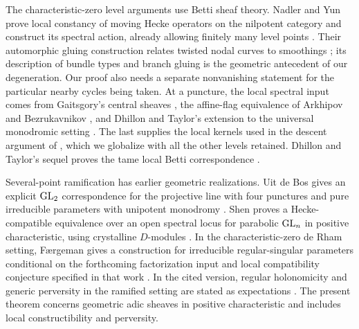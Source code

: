 The characteristic-zero level arguments use Betti sheaf theory.
Nadler and Yun prove local constancy of moving Hecke operators on the
nilpotent category and construct its spectral action, already allowing
finitely many level points \cite[Theorems~6.2.2 and~6.3.7]{NY}.
Their automorphic gluing construction relates twisted nodal curves to
smoothings \cite{NYGluing}; its description of bundle types and branch
gluing is the geometric antecedent of our degeneration. Our proof also
needs a separate nonvanishing statement for the particular nearby cycles
being taken. At a puncture, the local spectral input comes from
Gaitsgory's central sheaves \cite{GaitsgoryCentral}, the affine-flag
equivalence of Arkhipov and Bezrukavnikov \cite{AB}, and Dhillon and
Taylor's extension to the universal monodromic setting \cite{DT}.
The last supplies the local kernels used in the descent argument of
\cite[\S7]{CT}, which we globalize with all the other levels retained.
Dhillon and Taylor's sequel proves the tame local Betti correspondence
\cite{DTLocal}.

Several-point ramification has earlier geometric realizations. Uit de Bos
gives an explicit $\operatorname{GL}_2$ correspondence for the projective line with four
punctures and pure irreducible parameters with unipotent monodromy
\cite{UitDeBos}. Shen proves a Hecke-compatible equivalence over an open
spectral locus for parabolic $\operatorname{GL}_n$ in positive characteristic, using
crystalline $D$-modules \cite{Shen}. In the characteristic-zero de Rham
setting, F{\ae}rgeman gives a construction for irreducible regular-singular
parameters conditional on the forthcoming factorization input and local
compatibility conjecture specified in that work
\cite[Theorem~1.4.1.1, \S\S1.3.7, 1.4.3, Conjecture~4.2.1]{Faergeman}.
In the cited version,
regular holonomicity and generic perversity in the ramified setting are
stated as expectations \cite[Remark~1.4.1.2]{Faergeman}. The present
theorem concerns geometric adic sheaves in positive characteristic and
includes local constructibility and perversity.

